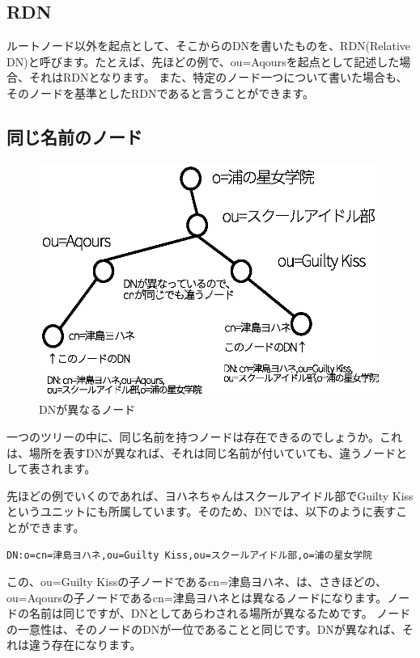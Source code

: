 \subsection{RDN}

ルートノード以外を起点として、そこからのDNを書いたものを、RDN(Relative DN)と呼びます。たとえば、先ほどの例で、ou=Aqoursを起点として記述した場合、それはRDNとなります。
また、特定のノード一つについて書いた場合も、そのノードを基準としたRDNであると言うことができます。

\subsection{同じ名前のノード}

\begin{figure}[htbp]
	\includegraphics[width=12cm,clip]{draw/alt_dn.eps}
	\caption{DNが異なるノード}
	\label{fig:alt_dn}
\end{figure}

一つのツリーの中に、同じ名前を持つノードは存在できるのでしょうか。これは、場所を表すDNが異なれば、それは同じ名前が付いていても、違うノードとして表されます。

先ほどの例でいくのであれば、ヨハネちゃんはスクールアイドル部でGuilty Kissというユニットにも所属しています。そのため、DNでは、以下のように表すことができます。

\begin{verbatim}
DN:o=cn=津島ヨハネ,ou=Guilty Kiss,ou=スクールアイドル部,o=浦の星女学院
\end{verbatim}

この、ou=Guilty Kissの子ノードであるcn=津島ヨハネ、は、さきほどの、ou=Aqoursの子ノードであるcn=津島ヨハネとは異なるノードになります。ノードの名前は同じですが、DNとしてあらわされる場所が異なるためです。
ノードの一意性は、そのノードのDNが一位であることと同じです。DNが異なれば、それは違う存在になります。

